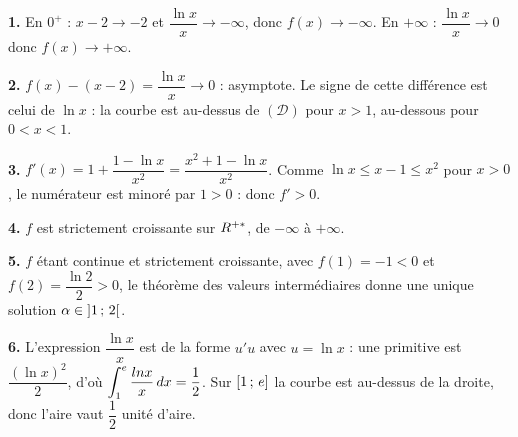 \begin{corrige}
\textbf{1.} En $0^{+}$ : $x-2 \to -2$ et $\dfrac{\ln x}{x} \to -\infty$, donc
$f(x) \to -\infty$. En $+\infty$ : $\dfrac{\ln x}{x} \to 0$ donc
$f(x) \to +\infty$.

\textbf{2.} $f(x)-(x-2) = \dfrac{\ln x}{x} \to 0$ : asymptote. Le signe de
cette différence est celui de $\ln x$ : la courbe est au-dessus de
$(\mathscr{D})$ pour $x>1$, au-dessous pour $0<x<1$.

\textbf{3.} $f'(x) = 1 + \dfrac{1-\ln x}{x^{2}} = \dfrac{x^{2}+1-\ln x}{x^{2}}$.
Comme $\ln x \leq x-1 \leq x^{2}$ pour $x>0$, le numérateur est minoré par
$1 > 0$ : donc $f'>0$.

\textbf{4.} $f$ est strictement croissante sur $R^{+*}$, de $-\infty$ à
$+\infty$.

\textbf{5.} $f$ étant continue et strictement croissante, avec $f(1) = -1 < 0$
et $f(2) = \dfrac{\ln 2}{2} > 0$, le théorème des valeurs intermédiaires donne
une unique solution $\alpha \in \left]1\,;\,2\right[$.

\textbf{6.} L'expression $\dfrac{\ln x}{x}$ est de la forme $u'u$ avec
$u = \ln x$ : une primitive est $\dfrac{(\ln x)^{2}}{2}$, d'où
$\displaystyle\int_{1}^{e}\frac{ln x}{x}\,dx = \frac12$. Sur
$\left[1\,;\,e\right]$ la courbe est au-dessus de la droite, donc l'aire vaut
$\dfrac12$ unité d'aire.
\end{corrige}

